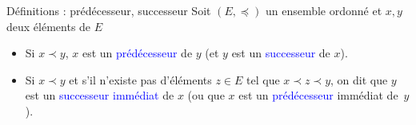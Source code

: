 \documentclass[10pt]{beamer}
\begin{document}
\begin{frame}{\Ctitle}{\stitle}
	\begin{alertblock}{Définitions : prédécesseur, successeur}
		Soit $(E,\preccurlyeq)$ un ensemble ordonné et $x,y$ deux éléments de $E$
		\begin{itemize}
			\item<2-> Si $x \prec y$, $x$ est un \textcolor{blue}{prédécesseur} de $y$ (et $y$ est un \textcolor{blue}{successeur} de $x$).
			\item<3-> Si $x \prec y$ et s'il n'existe pas d'éléments $z \in E$ tel que $x \prec z \prec y$, on dit que $y$ est un \textcolor{blue}{successeur immédiat} de $x$ (ou que $x$ est un \textcolor{blue}{prédécesseur} immédiat de~$y$).
		\end{itemize}
	\end{alertblock}
\end{frame}
\end{document}

